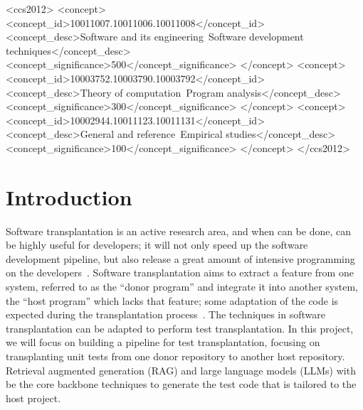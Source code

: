 \documentclass[sigconf]{acmart}
\begin{document}
\begin{CCSXML}
<ccs2012>
  <concept>
  <concept_id>10011007.10011006.10011008</concept_id>
  <concept_desc>Software and its engineering~Software development techniques</concept_desc>
  <concept_significance>500</concept_significance>
  </concept>
  <concept>
  <concept_id>10003752.10003790.10003792</concept_id>
  <concept_desc>Theory of computation~Program analysis</concept_desc>
  <concept_significance>300</concept_significance>
  </concept>
  <concept>
  <concept_id>10002944.10011123.10011131</concept_id>
  <concept_desc>General and reference~Empirical studies</concept_desc>
  <concept_significance>100</concept_significance>
  </concept>
</ccs2012>
\end{CCSXML}




\maketitle

\section{Introduction}
%
Software transplantation is an active research area, and when can be done, can be highly useful for developers; it will not only speed up the software development pipeline, but also release a great amount of intensive programming on the developers~\cite{alshahwan2023_softwaretestingchallenges, barr2015_automatedsoftwaretransplantation,fan2023_largelanguagemodelssoftware, souza2023_softwareproductlineengineering}.
%
Software transplantation aims to extract a feature from one system, referred to as the ``donor program'' and integrate it into another system, the ``host program'' which lacks that feature; some adaptation of the code is expected during the transplantation process~\cite{barr2015_automatedsoftwaretransplantation, sodhi2021_an_insight_on_software_features_supporting_transplantation__a_systematic_review}.
%
The techniques in software transplantation can be adapted to perform test transplantation. In this project, we will focus on building a pipeline for test transplantation, focusing on transplanting unit tests from one donor repository to another host repository.
%
Retrieval augmented generation (RAG) and large language models (LLMs) with be the core backbone techniques to generate the test code that is tailored to the host project.
\end{document}
